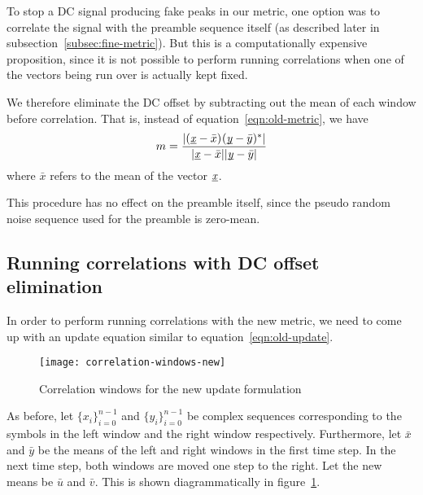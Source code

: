 To stop a DC signal producing fake peaks in our metric, one option was to
correlate the signal with the preamble sequence itself (as described later in
subsection~\ref{subsec:fine-metric}). But this is a computationally expensive
proposition, since it is not possible to perform running correlations when one
of the vectors being run over is actually kept fixed.

We therefore eliminate the DC offset by subtracting out the mean of each window
before correlation. That is, instead of equation~\ref{eqn:old-metric}, we have
\begin{equation} \label{eqn:new-metric}
	m = \frac{|\corr{(\ue{x}-\bar{x})}{(\ue{y}-\bar{y})}|}
	         {|\ue{x}-\bar{x}||\ue{y}-\bar{y}|}
\end{equation}
where $\bar{x}$ refers to the mean of the vector $\underbar{\emph{x}}$.

This procedure has no effect on the preamble itself, since the pseudo random
noise sequence used for the preamble is zero-mean.

\subsection{Running correlations with DC offset elimination}

In order to perform running correlations with the new metric, we need to
come up with an update equation similar to equation~\ref{eqn:old-update}.

\begin{figure}[h]
	\centering
	\texttt{[image: correlation-windows-new]}
	\caption{Correlation windows for the new update formulation}
	\label{fig:corr-win-new}
\end{figure}

As before, let $\{x_i\}_{i=0}^{n-1}$ and $\{y_i\}_{i=0}^{n-1}$ be complex
sequences corresponding to the symbols in the left window and the right window
respectively. Furthermore, let $\bar{x}$ and $\bar{y}$ be the means of the
left and right windows in the first time step. In the next time step, both
windows are moved one step to the right. Let the new means be $\bar{u}$ and
$\bar{v}$. This is shown diagrammatically in figure~\ref{fig:corr-win-new}.

